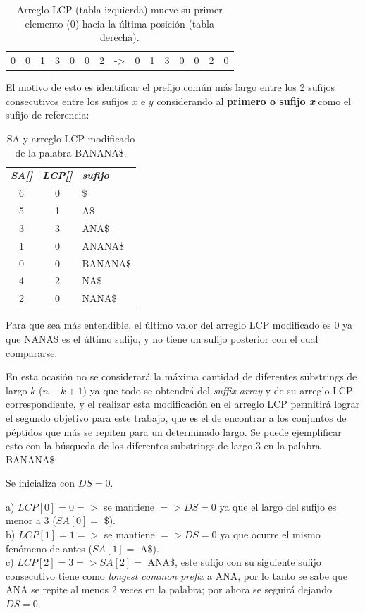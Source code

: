 \begin{table}[h]
\centering
\label{propuesta-2}
\begin{tabular}{|l|l|l|l|l|l|l|l|l|l|l|l|l|l|l|}
\cline{1-7} \cline{9-15}
0 & 0 & 1 & 3 & 0 & 0 & 2 & -\textgreater & 0 & 1 & 3 & 0 & 0 & 2 & 0 \\ \cline{1-7} \cline{9-15} 
\end{tabular}
\caption{Arreglo LCP (tabla izquierda) mueve su primer elemento (0) hacia la última posición (tabla derecha).}
\end{table}

El motivo de esto es identificar el prefijo común más largo entre los 2 sufijos consecutivos entre los sufijos $x$ e $y$ considerando al {\textbf{primero o sufijo \textit{x}}} como el sufijo de referencia:

\begin{table}[H]
	\centering
	\label{propuesta-21}
	\begin{tabular}{c c l}
		\textit{\textbf{SA[]}} & \textit{\textbf{LCP[]}} &\textit{\textbf{sufijo}}\\
		6 & 0 & \$\\
		5 & 1 & A\$\\
		3 & 3 & ANA\$\\
		1 & 0 & ANANA\$\\
		0 & 0 & BANANA\$\\
		4 & 2 & NA\$\\
		2 & 0 & NANA\$\\
	\end{tabular}
\caption{SA y arreglo LCP modificado de la palabra BANANA\$.}
\end{table}

Para que sea más entendible, el último valor del arreglo LCP modificado es 0 ya que NANA\$ es el último sufijo, y no tiene un sufijo posterior con el cual compararse.

En esta ocasión no se considerará la máxima cantidad de diferentes substrings de largo $k$ ($n-k+1$) ya que todo se obtendrá del \textit{suffix array} y de su arreglo LCP correspondiente, y el realizar esta modificación en el arreglo LCP permitirá lograr el segundo objetivo para este trabajo, que es el de encontrar a los conjuntos de péptidos que más se repiten para un determinado largo. Se puede ejemplificar esto con la búsqueda de los diferentes substrings de largo 3 en la palabra BANANA\$:

Se inicializa con $DS = 0$.

a) $LCP[0]=0 =>$ se mantiene $=> DS=0$ ya que el largo del sufijo es menor a 3 ($SA[0]=$ \$).\\
b) $LCP[1]=1 =>$ se mantiene $=> DS=0$ ya que ocurre el mismo fenómeno de antes ($SA[1]=$ A\$).\\ 
c) $LCP[2]=3 => SA[2] =$ ANA\$, este sufijo con su siguiente sufijo consecutivo tiene como \textit{longest common prefix} a ANA, por lo tanto se sabe que ANA se repite al menos 2 veces en la palabra; por ahora se seguirá dejando $DS = 0$.

